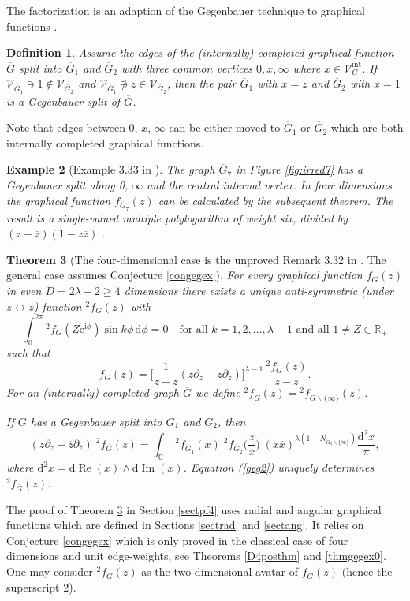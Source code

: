\documentclass[oneside]{amsart}
\newcommand{\CC}{{\mathbb C}}
\newcommand{\RR}{{\mathbb R}}
\newcommand{\ee}{\mathrm{e}}
\newcommand{\ii}{\mathrm{i}}
\newcommand{\dd}{\mathrm{d}}
\newcommand{\xx}{{\overline{x}}}
\newcommand{\zz}{{\overline{z}}}
\newcommand{\Gg}{{\overline{G}}}
\newcommand{\sV}{\mathcal{V}}
\newcommand{\sVGint}{{\sV_G^\mathrm{int}}}
\renewcommand{\Im}{\mathop\mathrm{Im}}
\renewcommand{\Re}{\mathop\mathrm{Re}}
\theoremstyle{plain}
\newtheorem{thm}{Theorem}
\newtheorem{defn}[thm]{Definition}
\newtheorem{ex}[thm]{Example}
\begin{document}
The factorization is an adaption of the Gegenbauer technique to graphical functions \cite{geg}.

\begin{defn}\label{defgegsplit}
Assume the edges of the (internally) completed graphical function $\Gg$ split into $\Gg_1$ and $\Gg_2$ with three common vertices $0,x,\infty$ where $x\in\sVGint$.
If $\sV_{\Gg_1}\ni 1\notin \sV_{\Gg_2}$ and $\sV_{\Gg_1}\not\ni z\in \sV_{\Gg_2}$, then the pair $\Gg_1$ with $x=z$ and $\Gg_2$ with $x=1$ is a Gegenbauer split of $\Gg$.
\end{defn}

Note that edges between 0, $x$, $\infty$ can be either moved to $\Gg_1$ or $\Gg_2$ which are both internally completed graphical functions.
\begin{ex}[Example 3.33 in \cite{gf}]\label{G7ex}
The graph $\Gg_7$ in Figure \ref{fig:irred7} has a Gegenbauer split along 0, $\infty$ and the central internal vertex.
In four dimensions the graphical function $f_{\Gg_7}(z)$ can be calculated by the subsequent theorem. The result is a single-valued multiple polylogarithm of weight six, divided by $(z-\zz)(1-z\zz)$ \cite{Shlog}.
\end{ex}

\begin{thm}[The four-dimensional case is the unproved Remark 3.32 in \cite{gf}. The general case assumes Conjecture \ref{congegex}]\label{thm4}
For every graphical function $f_G(z)$ in even $D=2\lambda+2\geq4$ dimensions there exists a unique anti-symmetric (under $z\leftrightarrow\zz$) function ${}^2\!f_G(z)$ with
\begin{equation}\label{eqthm4int}
\int_0^{2\pi}{}^2\!f_G(Z\ee^{\ii\phi})\sin k\phi\,\dd\phi=0\quad\text{for all $k=1,2,\ldots,\lambda-1$ and all $1\neq Z\in\RR_+$}
\end{equation}
such that
\begin{equation}\label{eq2av}
f_G(z)=\Big[\frac{1}{z-\zz}(z\partial_z-\zz\partial_\zz)\Big]^{\lambda-1}\,\frac{{}^2\!f_G(z)}{z-\zz}.
\end{equation}
For an (internally) completed graph $\Gg$ we define ${}^2\!f_\Gg(z)={}^2\!f_{\Gg\backslash\{\infty\}}(z)$.

If $\Gg$ has a Gegenbauer split into $\Gg_1$ and $\Gg_2$, then
\begin{equation}\label{geg2}
(z\partial_z-\zz\partial_\zz)\;{}^2\!f_\Gg(z)=\int_\CC\;{}^2\!f_{\Gg_1}(x)\;{}^2\!f_{\Gg_2}\Big(\frac{z}{x}\Big)\;(x\xx)^{\lambda(1-N_{\Gg_2\backslash\{\infty\}})}\frac{\dd^2x}{\pi},
\end{equation}
where $\dd^2x=\dd\Re(x)\wedge\dd\Im(x)$. Equation (\ref{geg2}) uniquely determines ${}^2\!f_\Gg(z)$.
\end{thm}
The proof of Theorem \ref{thm4} in Section \ref{sectpf4} uses radial and angular graphical functions which are defined in Sections \ref{sectrad} and \ref{sectang}.
It relies on Conjecture \ref{congegex} which is only proved in the classical case of four dimensions and unit edge-weights, see Theorems \ref{D4posthm} and \ref{thmgegex0}.
One may consider ${}^2\!f_G(z)$ as the two-dimensional avatar of $f_G(z)$ (hence the superscript 2). 
\end{document}
